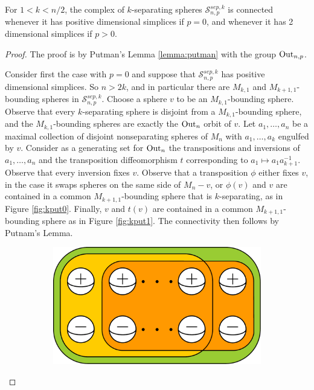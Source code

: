 \begin{lemma}
  \label{ksepconnect}
For $1<k<n/2$,
the complex of $k$-separating spheres
$\mathcal S^{sep,k}_{n,p}$
is connected whenever it has positive dimensional simplices if $p=0$,
and whenever it has 2 dimensional simplices if $p>0$.
\end{lemma}

\begin{proof}
The proof is by Putman's Lemma \ref{lemma:putman}
with the group $\operatorname{Out}_{n,p}$.

Consider first the case with $p=0$
and suppose that $\mathcal S^{sep,k}_{n,p}$ has positive dimensional simplices.
So $n>2k$, and in particular
there are $M_{k,1}$ and $M_{k+1,1}$-bounding spheres in $\mathcal S^{sep,k}_{n,p}$.
Choose a sphere $v$ to be an $M_{k,1}$-bounding sphere.
Observe that every $k$-separating sphere is disjoint from a
$M_{k,1}$-bounding sphere, and the $M_{k,1}$-bounding spheres
are exactly the $\operatorname{Out}_{n}$ orbit of $v$.
Let $a_1,\ldots,a_n$ be a maximal collection of disjoint nonseparating spheres
of $M_{n}$ with $a_1,\ldots, a_k$ engulfed by $v$.
Consider as a generating set for $\operatorname{Out}_{n}$
the transpositions and inversions of $a_1,\ldots,a_n$
and the transposition diffeomorphism $t$ corresponding to $a_1 \mapsto a_1a_{k+1}^{-1}$.
Observe that every inversion fixes $v$.
Observe that a transposition $\phi$ either fixes $v$, in the case it swaps
spheres on the same side of $M_n-v$, or $\phi(v)$ and $v$ are contained in a common
$M_{k+1,1}$-bounding sphere that is $k$-separating, as in Figure
\ref{fig:kput0}.
Finally, $v$ and $t(v)$ are contained in a common
$M_{k+1,1}$-bounding sphere as in Figure \ref{fig:kput1}.
The connectivity then follows by Putnam's Lemma.
\begin{figure}[b!]
    \centering
    \begin{subfigure}[b]{0.4\textwidth}
        \includegraphics[width=\textwidth]{figures/kput0.pdf}

\end{subfigure}
\end{figure}
\end{proof}
